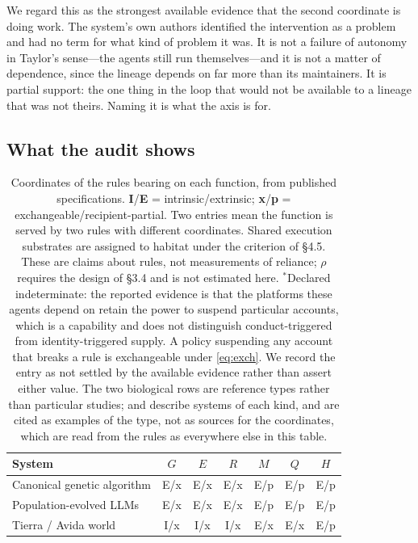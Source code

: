 \documentclass[review,3p,times]{elsarticle}
\begin{document}
We regard this as the strongest available evidence that the second
coordinate is doing work. The system's own authors identified the
intervention as a problem and had no term for what kind of problem it was.
It is not a failure of autonomy in Taylor's sense---the agents still run
themselves---and it is not a matter of dependence, since the lineage
depends on far more than its maintainers. It is partial support: the one
thing in the loop that would not be available to a lineage that was not
theirs. Naming it is what the axis is for.

\subsection{What the audit shows}

\begin{table}[ht]
\centering
\small
\caption{Coordinates of the rules bearing on each function, from published
specifications. \textbf{I}/\textbf{E} = intrinsic/extrinsic;
\textbf{x}/\textbf{p} = exchangeable/recipient-partial. Two entries mean
the function is served by two rules with different coordinates. Shared
execution substrates are assigned to habitat under the criterion of
\S4.5. These are claims about rules, not measurements of reliance; $\rho$
requires the design of \S3.4 and is not estimated here.
$^{*}$Declared indeterminate: the reported evidence is that the platforms
these agents depend on retain the power to suspend particular accounts, which
is a capability and does not distinguish conduct-triggered from
identity-triggered supply. A policy suspending any account that breaks a rule
is exchangeable under \eqref{eq:exch}. We record the entry as not settled by
the available evidence rather than assert either value.
The two biological rows are reference types rather than particular studies;
\citet{biller2015} and \citet{douglas1998} describe systems of each kind, and
are cited as examples of the type, not as sources for the coordinates, which
are read from the rules as everywhere else in this table.}
\label{tab:audit}
\begin{tabular}{lcccccc}
\toprule
\textbf{System} & $G$ & $E$ & $R$ & $M$ & $Q$ & $H$\\
\midrule
Canonical genetic algorithm      & E/x & E/x        & E/x & E/p & E/p & E/p\\
Population-evolved LLMs          & E/x & E/x        & E/x & E/p & E/p & E/p\\
Tierra / Avida world             & I/x & I/x        & I/x & E/x & E/x & E/p\\

\end{tabular}
\end{table}
\end{document}
